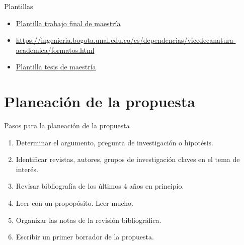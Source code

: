 \documentclass[
10pt,
aspectratio=169,
]{beamer}
\begin{document}
\begin{frame}[c]{Plantillas}
\begin{itemize}
\item  \href{https://ingenieria.bogota.unal.edu.co/es/dependencias/vicedecanatura-academica/formatos.html}{Plantilla trabajo final de maestr\'ia}
\item  \url{https://ingenieria.bogota.unal.edu.co/es/dependencias/vicedecanatura-academica/formatos.html}
\item  \href{https://ingenieria.bogota.unal.edu.co/es/dependencias/vicedecanatura-academica/formatos.html}{Plantilla tesis de maestr\'ia}
\end{itemize}
\end{frame}


\section{Planeaci\'on de la propuesta}
\begin{frame}[c]{Pasos para la planeaci\'on de la propuesta}
\begin{enumerate}
\item Determinar el argumento, pregunta de investigaci\'on o hipot\'esis.
\item Identificar revistas, autores, grupos de investigaci\'on claves en el tema de inter\'es.
\item Revisar bibliograf\'ia de los \'ultimos 4 a\~nos en principio. 
\item Leer con un propop\'osito. Leer mucho.
\item Organizar las notas de la revisi\'on bibliogr\'afica.
\item Escribir un primer borrador de la propuesta. 
\end{enumerate}
\end{frame}
\end{document}
